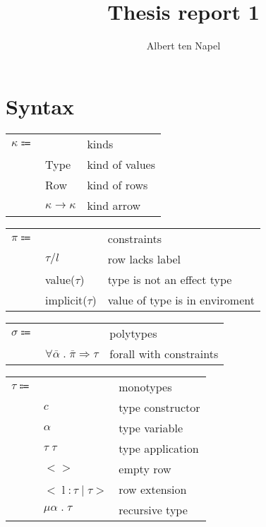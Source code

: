 \documentclass[12pt]{article}
\title{Thesis report 1}
\author{Albert ten Napel}
\date{}
\begin{document}
\section{Syntax}

\begin{tabular}{l l l}
	$\kappa \Coloneqq$ & & kinds \\
		& Type & kind of values \\
		& Row & kind of rows \\
		& $\kappa \rightarrow \kappa$ & kind arrow \\
\end{tabular}

\vspace{15pt}\noindent
\begin{tabular}{l l l}
	$\pi \Coloneqq$ & & constraints \\
		& $\tau / l$ & row lacks label \\
		& value($\tau$) & type is not an effect type \\
		& implicit($\tau$) & value of type is in enviroment \\
\end{tabular}

\vspace{15pt}\noindent
\begin{tabular}{l l l}
	$\sigma \Coloneqq$ & & polytypes \\
		& $\forall \bar{\alpha} \; . \; \bar{\pi} \Rightarrow \tau$ & forall with constraints \\
\end{tabular}

\vspace{15pt}\noindent
\begin{tabular}{l l l}
	$\tau \Coloneqq$ & & monotypes \\
		& $c$ & type constructor \\
		& $\alpha$ & type variable\\
		& $\tau \; \tau$ & type application \\
		& $<>$ & empty row \\ 
		& $< \; $l$ \; : \tau \; | \; \tau >$ & row extension \\
		& $\mu \alpha \; . \; \tau$ & recursive type \\
\end{tabular}
\end{document}
